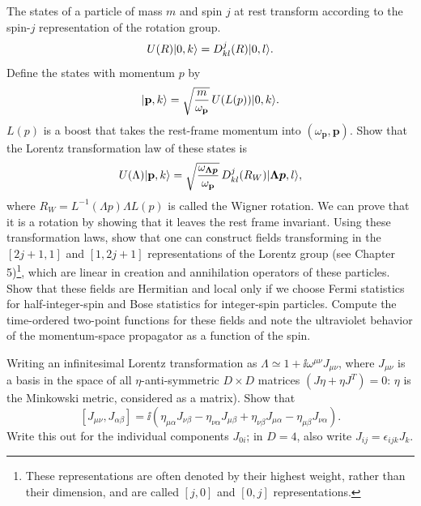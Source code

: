 \begin{banksproblems}
The states of a particle of mass $m$ and spin $j$ at rest transform according to the spin-$j$ representation of the rotation group.
\[
  U(R)\lvert 0,k\rangle=D^{j}_{kl}(R)\lvert 0,l\rangle.
\]
Define the states with momentum $p$ by
\[
  \lvert \mathbf p,k\rangle=\sqrt{\frac{m}{\omega_{\mathbf p}}}\,U(L(p))\lvert 0,k\rangle.
\]
$L(p)$ is a boost that takes the rest-frame momentum into $(\omega_{\mathbf p},\mathbf{p})$. Show that the Lorentz transformation law of these states is
\[
  U(\Lambda)\lvert \mathbf p,k\rangle=\sqrt{\frac{\omega_{\boldsymbol{\Lambda p}}}{\omega_{\mathbf p}}}\,
  D^{j}_{kl}(R_{W})\lvert \boldsymbol{\Lambda p},l\rangle,
\]
where $R_{W}=L^{-1}(\Lambda p)\Lambda L(p)$ is called the Wigner rotation. We can prove that it is a rotation by showing that it leaves the rest frame invariant. Using these transformation laws, show that one can construct fields transforming in the $[2j+1,1]$ and $[1,2j+1]$ representations of the Lorentz group (see Chapter 5)\footnote[5]{These representations are often denoted by their highest weight, rather than their dimension, and are called $[j,0]$ and $[0,j]$ representations.}, which are linear in creation and annihilation operators of these particles. Show that these fields are Hermitian and local only if we choose Fermi statistics for half-integer-spin and Bose statistics for integer-spin particles. Compute the time-ordered two-point functions for these fields and note the ultraviolet behavior of the momentum-space propagator as a function of the spin.
\setcounter{footnote}{5}

Writing an infinitesimal Lorentz transformation as $\Lambda\simeq 1+\ii\omega^{\mu\nu}J_{\mu\nu}$, where $J_{\mu\nu}$ is a basis in the space of all $\eta$-anti-symmetric $D\times D$ matrices $(J\eta+\eta J^{T})=0$: $\eta$ is the Minkowski metric, considered as a matrix). Show that
\[
  [J_{\mu\nu},J_{\alpha\beta}]
  =\ii\left(\eta_{\mu\alpha}J_{\nu\beta}-\eta_{\nu\alpha}J_{\mu\beta}
  +\eta_{\nu\beta}J_{\mu\alpha}-\eta_{\mu\beta}J_{\nu\alpha}\right).
\]
Write this out for the individual components $J_{0i}$; in $D=4$, also write $J_{ij}=\epsilon_{ijk}J_{k}$.


\end{banksproblems}
